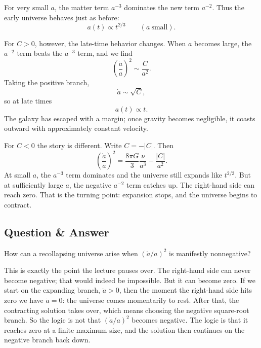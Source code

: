 For very small \(a\), the matter term \(a^{-3}\) dominates the new term \(a^{-2}\). Thus the early universe behaves just as before:
\begin{equation}
a(t)\propto t^{2/3}
\qquad
(a \ \text{small}).
\end{equation}

For \(C>0\), however, the late-time behavior changes. When \(a\) becomes large, the \(a^{-2}\) term beats the \(a^{-3}\) term, and we find
\begin{equation}
\left(\frac{\dot a}{a}\right)^2 \sim \frac{C}{a^2}.
\end{equation}
Taking the positive branch,
\begin{equation}
\dot a \sim \sqrt{C},
\end{equation}
so at late times
\begin{equation}
a(t)\propto t.
\end{equation}
The galaxy has escaped with a margin; once gravity becomes negligible, it coasts outward with approximately constant velocity.

For \(C<0\) the story is different. Write \(C=-|C|\). Then
\begin{equation}
\left(\frac{\dot a}{a}\right)^2
=
\frac{8\pi G}{3}\frac{\nu}{a^3}
-
\frac{|C|}{a^2}.
\end{equation}
At small \(a\), the \(a^{-3}\) term dominates and the universe still expands like \(t^{2/3}\). But at sufficiently large \(a\), the negative \(a^{-2}\) term catches up. The right-hand side can reach zero. That is the turning point: expansion stops, and the universe begins to contract.

\subsection{Question \& Answer}

How can a recollapsing universe arise when \(\left(\dot a/a\right)^2\) is manifestly nonnegative?

This is exactly the point the lecture pauses over. The right-hand side can never become negative; that would indeed be impossible. But it can become zero. If we start on the expanding branch, \(\dot a>0\), then the moment the right-hand side hits zero we have \(\dot a=0\): the universe comes momentarily to rest. After that, the contracting solution takes over, which means choosing the negative square-root branch. So the logic is not that \(\left(\dot a/a\right)^2\) becomes negative. The logic is that it reaches zero at a finite maximum size, and the solution then continues on the negative branch back down.

